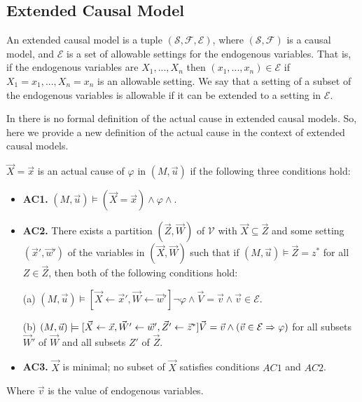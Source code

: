 \subsection{Extended Causal Model}
An extended causal model is a tuple $(\mathcal{S},\mathcal{F},
    \mathcal{E})$, where $(\mathcal{S},\mathcal{F})$ is a causal model, and $\mathcal{E}$ is a set of allowable settings for the endogenous variables.
That is, if the endogenous variables are $X_1,...,X_n$ then
$(x_1,...,x_n) \in \mathcal{E}$ if $X_1 = x_1, ..., X_n=x_n$ is an
allowable setting.
We say that a setting of a subset of the endogenous variables is allowable if it can be extended to a setting in $\mathcal{E}$.

In \cite{hp} there is no formal definition of the actual cause 
in extended causal models.
So, here we provide a new definition of the actual cause 
in the context of extended causal models.


\begin{definition}
    $\vec X = \vec x$ is an actual cause of $\varphi$ in $(M,\vec u)$ if the following three conditions hold:
    \begin{itemize}
        \item  \textbf{AC1.} $(M,\vec u)\models (\vec X = \vec x) \wedge \varphi \wedge $.
        \item  \textbf{AC2. }There exists a partition $(\vec Z, \vec W)$ of $\mathcal{V}$ with $\vec X \subseteq \vec Z$ and some setting $(\vec x',\vec w')$ of the variables in $(\vec X,\vec W)$ such that if $(M,\vec u)\models \vec Z = z^*$ for all $Z\in \vec Z$, then both of the following conditions hold:

              (a) $(M,\vec u)\models[\vec X \leftarrow \vec x', \vec W \leftarrow \vec w']\neg \varphi 
              \wedge \vec V = \vec v
              \wedge  \vec v \in \mathcal{E}$.

              (b) $(M,\vec u)\models[\vec X\leftarrow \vec x, \vec W' 
              \leftarrow \vec w', \vec Z'\leftarrow \vec z^*]
              \vec V = \vec v \wedge (\vec v \in \mathcal{E} \Rightarrow \varphi)$
                  for all subsets $\vec W'$ of $\vec W$ and all subsets $Z'$ of $\vec Z$.

        \item  \textbf{AC3.} $\vec X$ is minimal; no subset of $\vec X$ satisfies conditions $AC1$ and $AC2$.
    \end{itemize}
    Where $\vec v$ is the value of endogenous variables.
\end{definition}
